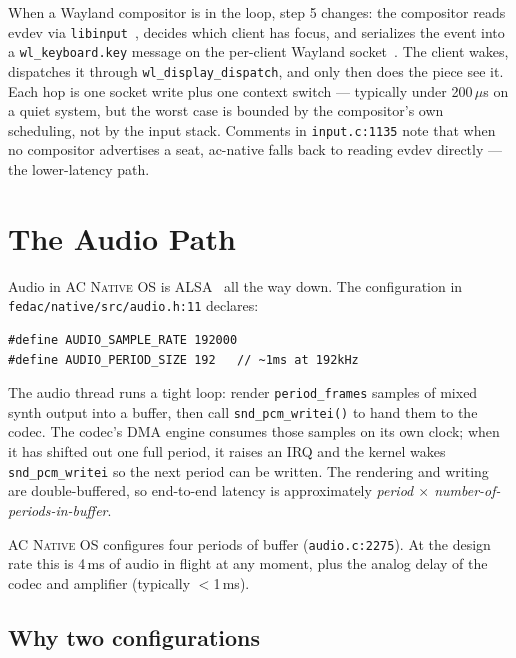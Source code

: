 \documentclass[10pt,letterpaper,twocolumn]{article}
\newcommand{\acos}{\textsc{AC Native OS}}
\begin{document}
When a Wayland compositor is in the loop, step 5 changes: the compositor reads evdev via \texttt{libinput}~\citep{libinput}, decides which client has focus, and serializes the event into a \texttt{wl\_keyboard.key} message on the per-client Wayland socket~\citep{wayland}. The client wakes, dispatches it through \texttt{wl\_display\_dispatch}, and only then does the piece see it. Each hop is one socket write plus one context switch --- typically under 200\,$\mu$s on a quiet system, but the worst case is bounded by the compositor's own scheduling, not by the input stack. Comments in \texttt{input.c:1135} note that when no compositor advertises a seat, ac-native falls back to reading evdev directly --- the lower-latency path.


\section{The Audio Path}
\label{sec:audiopath}

Audio in \acos{} is ALSA~\citep{alsa} all the way down. The configuration in \texttt{fedac/native/src/audio.h:11} declares:

\begin{lstlisting}[style=accstyle]
#define AUDIO_SAMPLE_RATE 192000
#define AUDIO_PERIOD_SIZE 192   // ~1ms at 192kHz
\end{lstlisting}

The audio thread runs a tight loop: render \texttt{period\_frames} samples of mixed synth output into a buffer, then call \texttt{snd\_pcm\_writei()} to hand them to the codec. The codec's DMA engine consumes those samples on its own clock; when it has shifted out one full period, it raises an IRQ and the kernel wakes \texttt{snd\_pcm\_writei} so the next period can be written. The rendering and writing are double-buffered, so end-to-end latency is approximately \emph{period $\times$ number-of-periods-in-buffer}.

\acos{} configures four periods of buffer (\texttt{audio.c:2275}). At the design rate this is 4\,ms of audio in flight at any moment, plus the analog delay of the codec and amplifier (typically $<$1\,ms).

\subsection{Why two configurations}
\end{document}
